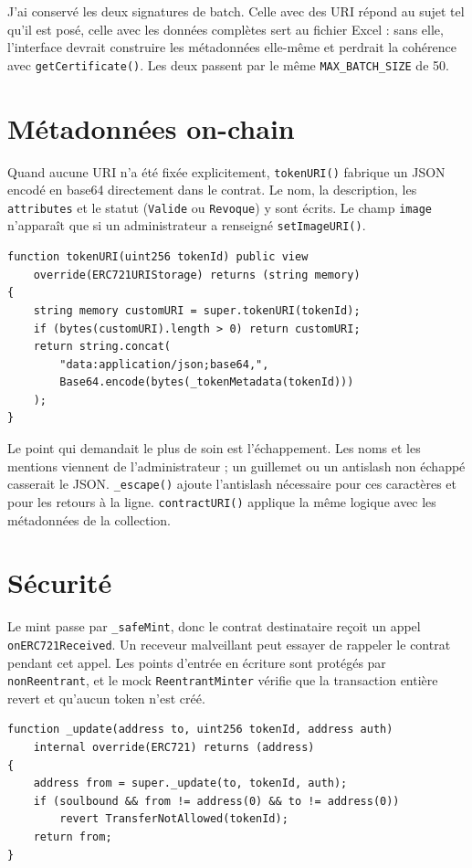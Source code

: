 \documentclass[11pt,a4paper,parskip=half]{scrartcl}
\begin{document}
J'ai conservé les deux signatures de batch. Celle avec des URI répond au sujet
tel qu'il est posé, celle avec les données complètes sert au fichier Excel :
sans elle, l'interface devrait construire les métadonnées elle-même et perdrait
la cohérence avec \texttt{getCertificate()}. Les deux passent par le même
\texttt{MAX\_BATCH\_SIZE} de 50.

\section{Métadonnées on-chain}

Quand aucune URI n'a été fixée explicitement, \texttt{tokenURI()} fabrique un JSON
encodé en base64 directement dans le contrat. Le nom, la description, les
\texttt{attributes} et le statut (\texttt{Valide} ou \texttt{Revoque}) y sont
écrits. Le champ \texttt{image} n'apparaît que si un administrateur a renseigné
\texttt{setImageURI()}.

\begin{lstlisting}
function tokenURI(uint256 tokenId) public view
    override(ERC721URIStorage) returns (string memory)
{
    string memory customURI = super.tokenURI(tokenId);
    if (bytes(customURI).length > 0) return customURI;
    return string.concat(
        "data:application/json;base64,",
        Base64.encode(bytes(_tokenMetadata(tokenId)))
    );
}
\end{lstlisting}

Le point qui demandait le plus de soin est l'échappement. Les noms et les mentions
viennent de l'administrateur ; un guillemet ou un antislash non échappé casserait
le JSON. \texttt{\_escape()} ajoute l'antislash nécessaire pour ces caractères et
pour les retours à la ligne. \texttt{contractURI()} applique la même logique avec
les métadonnées de la collection.

\section{Sécurité}

Le mint passe par \texttt{\_safeMint}, donc le contrat destinataire reçoit un
appel \allowbreak \texttt{onERC721Received}. Un receveur malveillant peut essayer de rappeler
le contrat pendant cet appel. Les points d'entrée en écriture sont protégés par
\texttt{nonReentrant}, et le mock \texttt{ReentrantMinter} vérifie que la
transaction entière revert et qu'aucun token n'est créé.

\begin{lstlisting}
function _update(address to, uint256 tokenId, address auth)
    internal override(ERC721) returns (address)
{
    address from = super._update(to, tokenId, auth);
    if (soulbound && from != address(0) && to != address(0))
        revert TransferNotAllowed(tokenId);
    return from;
}
\end{lstlisting}
\end{document}
